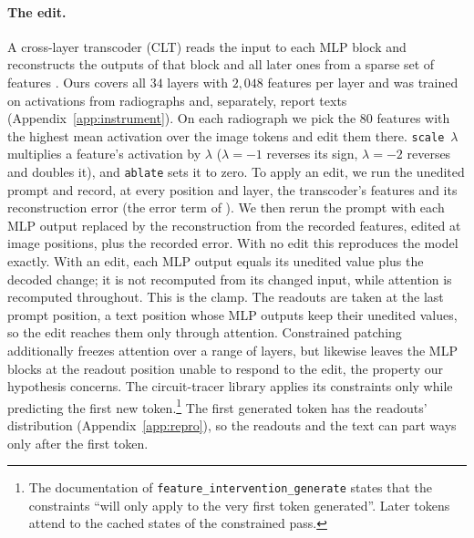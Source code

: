 \documentclass{article}
\begin{document}
\paragraph{The edit.} A cross-layer transcoder (CLT) reads the input to each MLP block and
reconstructs the outputs of that block and all later ones from a sparse set of features
\citep{lindsey2024crosscoders,ameisen2025circuit}. Ours covers all $34$ layers with $2{,}048$
features per layer and was trained on activations from radiographs and, separately, report texts
(Appendix~\ref{app:instrument}). On each radiograph we pick the $80$ features with the highest mean
activation over the image tokens and edit them there. \texttt{scale}~$\lambda$ multiplies a
feature's activation by $\lambda$ ($\lambda=-1$ reverses its sign, $\lambda=-2$ reverses and doubles
it), and \texttt{ablate} sets it to zero. To apply an edit, we run the unedited prompt and record, at
every position and layer, the transcoder's features and its reconstruction error (the error term of
\citealp{ameisen2025circuit}). We then rerun the prompt with each MLP output replaced by the
reconstruction from the recorded features, edited at image positions, plus the recorded error. With
no edit this reproduces the model exactly. With an edit, each MLP output equals its unedited value
plus the decoded change; it is not recomputed from its changed input, while attention is recomputed
throughout. This is the clamp. The readouts are taken at the last prompt position, a text position
whose MLP outputs keep their unedited values, so the edit reaches them only through attention.
Constrained patching \mbox{\citep{ameisen2025circuit}} additionally freezes attention over a range of
layers, but likewise leaves the MLP blocks at the readout position unable to respond to the edit,
the property our hypothesis concerns. The circuit-tracer library \citep{hanna2025circuittracer} applies its constraints
only while predicting the first new token.\footnote{The documentation of
\texttt{feature\_intervention\_generate} states that the constraints ``will only apply to the very
first token generated''. Later tokens attend to the cached states of the constrained pass.} The
first generated token has the readouts' distribution (Appendix~\ref{app:repro}), so the readouts and
the text can part ways only after the first token.
\end{document}

